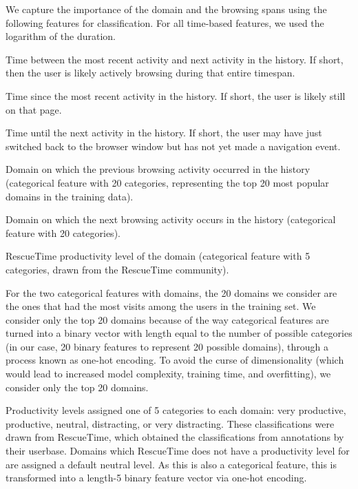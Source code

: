 \documentclass{sigchi}
\begin{document}
We capture the importance of the domain and the browsing spans using the following features for classification. For all time-based features, we used the logarithm of the duration.

\begin{compactitem}
    \item Time between the most recent activity and next activity in the history. If short, then the user is likely actively browsing during that entire timespan.
    \item Time since the most recent activity in the history. If short, the user is likely still on that page.
    \item Time until the next activity in the history. If short, the user may have just switched back to the browser window but has not yet made a navigation event.
    \item Domain on which the previous browsing activity occurred in the history (categorical feature with 20 categories, representing the top 20 most popular domains in the training data).
    \item Domain on which the next browsing activity occurs in the history (categorical feature with 20 categories).
    \item RescueTime productivity level of the domain (categorical feature with 5 categories, drawn from the RescueTime community).
\end{compactitem}

For the two categorical features with domains, the 20 domains we consider are the ones that had the most visits among the users in the training set. We consider only the top 20 domains because of the way categorical features are turned into a binary vector with length equal to the number of possible categories (in our case, 20 binary features to represent 20 possible domains), through a process known as one-hot encoding. To avoid the curse of dimensionality (which would lead to increased model complexity, training time, and overfitting), we consider only the top 20 domains.

Productivity levels assigned one of 5 categories to each domain: very productive, productive, neutral, distracting, or very distracting. These classifications were drawn from RescueTime, which obtained the classifications from annotations by their userbase. Domains which RescueTime does not have a productivity level for are assigned a default neutral level. As this is also a categorical feature, this is transformed into a length-5 binary feature vector via one-hot encoding.
\end{document}
